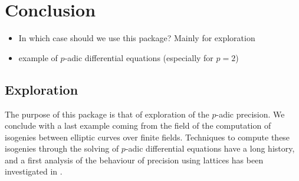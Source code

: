 \documentclass[sigconf]{acmart}
\theoremstyle{definition}
\begin{document}


\section{Conclusion}

\begin{itemize}
\item In which case should we use this package? Mainly for exploration
\item example of $p$-adic differential equations (especially for $p=2$)
\end{itemize}

\subsection{Exploration}

The purpose of this package is that of exploration
of the $p$-adic precision.
We conclude with a last example coming
from the field of the computation of
isogenies between elliptic curves over finite fields.
Techniques to compute these isogenies
through the solving of $p$-adic differential equations
have a long history, and a first
analysis of the behaviour of precision using
lattices has been investigated in \cite{LV16}.
\end{document}
